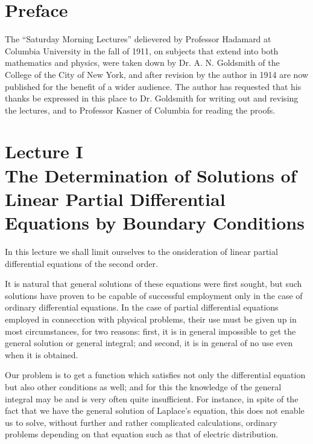 \documentclass[12pt,oneside]{book}
\begin{document}
\pagebreak
\chapter{Preface}
\noindent The ``Saturday Morning Lectures'' delievered by Professor Hadamard at Columbia University
in the fall of 1911, on subjects that extend into both mathematics and physics, were taken down
by Dr. A. N. Goldsmith of the College of the City of New York, and after revision by the author in 1914
are now published for the benefit of a wider audience. The author has requested that his thanks be expressed
in this place to Dr. Goldsmith for writing out and revising the lectures, and to Professor Kasner of Columbia
for reading the proofs. \par 

\tableofcontents

\mainmatter

\chapter{Lecture I\\
The Determination of Solutions of Linear Partial Differential Equations by Boundary Conditions}
\vspace*{-\baselineskip}
In this lecture we shall limit ourselves to the onsideration of linear partial differential equations 
of the second order. \par

It is natural that general solutions of these equations were first sought, but such solutions have 
proven to be capable of successful employment only in the case of ordinary differential equations. 
In the case of partial differential equations employed in connecction with physical problems, 
their use must be given up in most circumstances, for two reasons: first, it is in general impossible
to get the general solution or general integral; and second, it is in general of no use even when it 
is obtained. \par 

Our problem is to get a function which satisfies not only the differential equation but also other
conditions as well; and for this the knowledge of the general integral may be and is very often 
quite insufficient. For instance, in spite of the fact that we have the general solution of Laplace's 
equation, this does not enable us to solve, without further and rather complicated calculations, 
ordinary problems depending on that equation such as that of electric distribution. \par 
\end{document}

